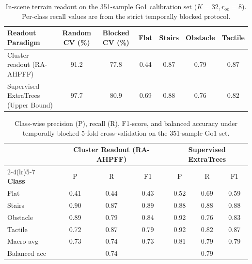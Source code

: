 \documentclass[11pt, a4paper]{article}
\begin{document}
\begin{table}[htbp]
    \centering
    \caption{In-scene terrain readout on the 351-sample Go1 calibration set ($K=32, r_{\text{oc}}=8$). Per-class recall values are from the strict temporally blocked protocol.}
    \label{tab:go1_cluster}
    \footnotesize
    \begin{tabular}{lcccccc}
        \toprule
        \textbf{Readout Paradigm} & \textbf{Random CV (\%)} & \textbf{Blocked CV (\%)} & \textbf{Flat} & \textbf{Stairs} & \textbf{Obstacle} & \textbf{Tactile} \\
        \midrule
        Cluster readout (RA-AHPFF) & 91.2 & 77.8 & 0.44 & 0.87 & 0.79 & 0.87 \\
        Supervised ExtraTrees (Upper Bound) & 97.7 & 80.9 & 0.69 & 0.88 & 0.76 & 0.82 \\
        \bottomrule
    \end{tabular}
\end{table}

\begin{table}[htbp]
    \centering
    \caption{Class-wise precision (P), recall (R), F1-score, and balanced accuracy under temporally blocked 5-fold cross-validation on the 351-sample Go1 set.}
    \label{tab:go1_classwise}
    \footnotesize
    \begin{tabular}{lcccccc}
        \toprule
        & \multicolumn{3}{c}{\textbf{Cluster Readout (RA-AHPFF)}} & \multicolumn{3}{c}{\textbf{Supervised ExtraTrees}} \\
        \cmidrule(lr){2-4}\cmidrule(lr){5-7}
        \textbf{Class} & P & R & F1 & P & R & F1 \\
        \midrule
        Flat & 0.41 & 0.44 & 0.43 & 0.52 & 0.69 & 0.59 \\
        Stairs & 0.90 & 0.87 & 0.89 & 0.88 & 0.88 & 0.88 \\
        Obstacle & 0.89 & 0.79 & 0.84 & 0.92 & 0.76 & 0.83 \\
        Tactile & 0.72 & 0.87 & 0.79 & 0.92 & 0.82 & 0.87 \\
        \midrule
        Macro avg & 0.73 & 0.74 & 0.73 & 0.81 & 0.79 & 0.79 \\
        Balanced acc & \multicolumn{3}{c}{0.74} & \multicolumn{3}{c}{0.79} \\
        \bottomrule
    \end{tabular}
\end{table}
\end{document}
